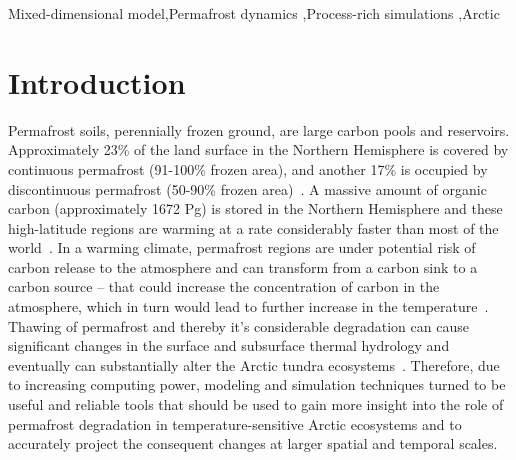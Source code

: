 \documentclass[review]{elsarticle}
\begin{document}
\begin{frontmatter}
\begin{keyword}
Mixed-dimensional model\sep Permafrost dynamics  \sep Process-rich simulations \sep Arctic 
\end{keyword}
\end{frontmatter}

\linenumbers

\section{Introduction}

Permafrost soils, perennially frozen ground, are large carbon pools and reservoirs. Approximately 23\% of the land surface in the Northern Hemisphere is covered by continuous permafrost (91-100\% frozen area), and another 17\% is occupied by discontinuous permafrost (50-90\% frozen area)~\cite{brown1997circum,jorgenson2001permafrost}. A massive amount of organic carbon (approximately 1672 Pg) is stored in the Northern Hemisphere and these high-latitude regions are warming at a rate considerably faster than most of the world~\cite{tarnocai2009soil, turner2007arctic, hansen1999giss, assessment2004impacts}. In a warming climate, permafrost regions are under potential risk of carbon release to the atmosphere and can transform from a carbon sink to a carbon source -- that could increase the concentration of carbon in the atmosphere, which in turn would lead to further increase in the temperature~\cite{billings1982arctic}. Thawing of permafrost and thereby it's considerable degradation can cause significant changes in the surface and subsurface thermal hydrology and eventually can substantially alter the Arctic tundra ecosystems~\cite{osterkamp1983response, walvoord2007increased, lyon2009estimation, pachauri2014climate,koven2013analysis}. Therefore, due to increasing computing power, modeling and simulation techniques turned to be useful and reliable tools that should be used to gain more insight into the role of permafrost degradation in temperature-sensitive Arctic ecosystems and to accurately project the consequent changes at larger spatial and temporal scales.
\end{document}
